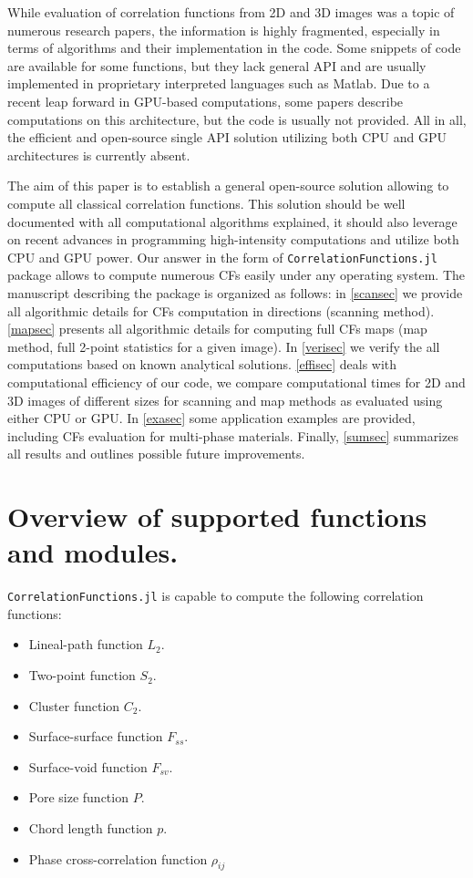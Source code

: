 \documentclass[reprint,amsmath,amssymb,aps,pre]{revtex4-1}
\newcommand{\code}[1]{\colorbox{light-gray}{\texttt{#1}}}
\begin{document}
While evaluation of correlation functions from 2D and 3D images was a topic of
numerous research papers, the information is highly fragmented, especially in
terms of algorithms and their implementation in the code. Some snippets of code
are available for some functions, but they lack general API and are usually
implemented in proprietary interpreted languages such as Matlab. Due to a recent
leap forward in GPU-based computations, some papers describe computations on
this architecture, but the code is usually not provided. All in all, the
efficient and open-source single API solution utilizing both CPU and GPU
architectures is currently absent.

The aim of this paper is to establish a general open-source solution allowing to
compute all classical correlation functions. This solution should be well
documented with all computational algorithms explained, it should also leverage
on recent advances in programming high-intensity computations and utilize both
CPU and GPU power. Our answer in the form of \code{CorrelationFunctions.jl}
package allows to compute numerous CFs easily under any operating system. The
manuscript describing the package is organized as follows: in \cref{scansec} we
provide all algorithmic details for CFs computation in directions (scanning
method). \cref{mapsec} presents all algorithmic details for computing full CFs
maps (map method, full 2-point statistics for a given image). In \cref{verisec}
we verify the all computations based on known analytical
solutions. \cref{effisec} deals with computational efficiency of our code, we
compare computational times for 2D and 3D images of different sizes for scanning
and map methods as evaluated using either CPU or GPU. In \cref{exasec} some
application examples are provided, including CFs evaluation for multi-phase
materials. Finally, \cref{sumsec} summarizes all results and outlines possible
future improvements.

\section{Overview of supported functions and modules.}
\label{oversec}
\verb+CorrelationFunctions.jl+ is capable to compute the following correlation
functions:
\begin{itemize}
\item Lineal-path function $L_2$.
\item Two-point function $S_2$.
\item Cluster function $C_2$.
\item Surface-surface function $F_{ss}$.
\item Surface-void function $F_{sv}$.
\item Pore size function $P$.
\item Chord length function $p$.
\item Phase cross-correlation function $\rho_{ij}$
\end{itemize}
\end{document}
